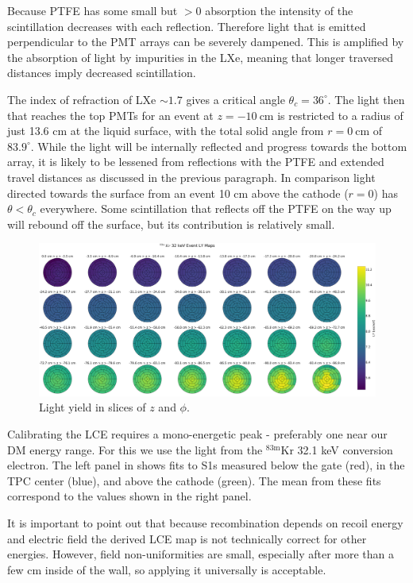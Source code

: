 Because PTFE has some small but $> 0$ absorption the intensity of the scintillation decreases with each reflection.  Therefore light
that is emitted perpendicular to the PMT arrays can be severely dampened.  This is amplified by the absorption of light by
impurities in the LXe, meaning that longer traversed distances imply decreased scintillation.

The index of refraction of LXe ${\sim} 1.7$
gives a critical angle $\theta_c = 36^{\circ}$.  The light then that reaches the top PMTs for an event at
$z = -10\ \mathrm{cm}$ is restricted to a radius of just 13.6 cm at the liquid surface, with the total solid angle from
$r = 0\ \mathrm{cm}$ of $83.9^{\circ}$.  While the light will be internally reflected and progress towards the bottom array, it is likely
to be lessened from reflections with the PTFE and extended travel distances as discussed in the previous paragraph. In comparison light
directed towards the surface from an event 10 cm above the cathode ($r = 0$)
has $\theta < \theta_c$ everywhere.  Some scintillation that reflects off the PTFE on the way up will rebound off the surface, but its
contribution is relatively small.

\begin{figure}
\centering
\includegraphics[width=\textwidth]{LCEMapPolar}
\caption{Light yield in slices of $z$ and $\phi$.}
\label{fig:calibrations_lce_polar}
\end{figure}

Calibrating the LCE requires a mono-energetic peak - preferably one near our DM energy range.  For this we use the light from the
$\mathrm{^{83m}Kr}$ 32.1 keV conversion electron.  The left panel in  shows fits to S1s measured below the gate
(red), in the TPC center (blue), and above the cathode (green).  The mean from these fits correspond to the values shown in the right
panel.

It is important to point out that because recombination depends on recoil energy and electric field the derived LCE map is not
technically correct for other energies.  However, field non-uniformities are small, especially after more than a few cm inside of the
wall, so applying it universally is acceptable.

